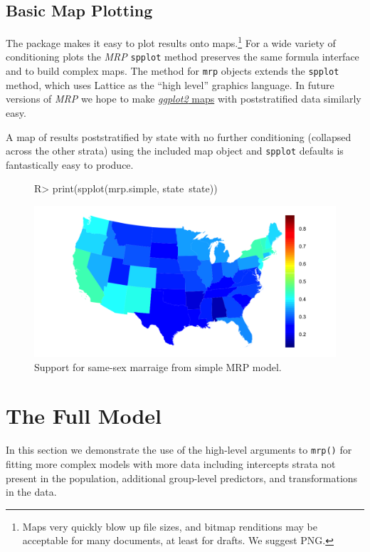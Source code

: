 \documentclass[11pt]{article} %
\begin{document}
\subsection{Basic Map Plotting}
\label{sec:basic-map-plotting}

The package makes it easy to plot results onto maps.\footnote{Maps very quickly blow up file sizes, and bitmap renditions may be acceptable for many documents, at least for drafts. We suggest PNG.} For a wide variety of conditioning plots the \emph{MRP} \texttt{spplot} method preserves the same formula interface and to build complex maps. The method for \texttt{mrp} objects extends the \texttt{spplot} method, which uses Lattice as the “high level” graphics language.
In future versions of \emph{MRP} we hope to make \href{http://spatialanalysis.co.uk/2010/09/27/maps-with-ggplot2/}{\emph{ggplot2} maps} with poststratified data similarly easy.

A map of results poststratified by state with no further conditioning (collapsed across the other strata) using the included map object and \texttt{spplot} defaults is fantastically easy to produce.
\begin{figure}
  \centering
  \caption{Support for same-sex marraige from simple MRP model.}
  \label{fig:firstmap}
\begin{Schunk}
\begin{Sinput}
R> print(spplot(mrp.simple, state~state))
\end{Sinput}
\end{Schunk}
\includegraphics{MRP-vignette-firstmap}
\end{figure}

\section{The Full Model}
\label{sec:full-model}

In this section we demonstrate the use of the high-level arguments to \texttt{mrp()} for fitting more complex models with more data including intercepts strata not present in the population, additional group-level predictors, and transformations in the data.
\end{document}
